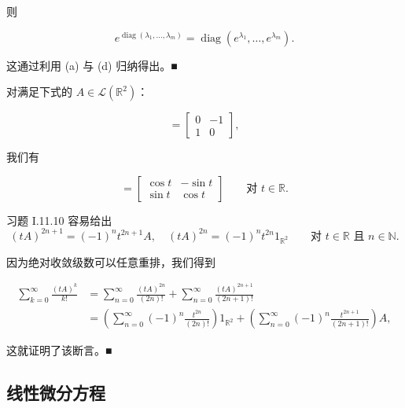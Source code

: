 \begin{example}
\begin{items}
则

\[
e^{\operatorname{diag}(\lambda_{1}, \ldots, \lambda_{m})} = \operatorname{diag}(e^{\lambda_{1}}, \ldots, e^{\lambda_{m}}) .
\]

\proofhead
这通过利用 (a) 与 (d) 归纳得出。\nobreak\hspace{0.35em}■
\item

对满足下式的 $ A \in \mathcal{L}(\mathbb{R}^{2}) $：

\begin{equation*}
[A] = \begin{bmatrix} 0 & -1 \\ 1 & 0 \end{bmatrix} ,
\end{equation*}

我们有

\begin{equation*}
[e^{tA}] = \begin{bmatrix} \cos t & -\sin t \\ \sin t & \cos t \end{bmatrix} \qquad \text{对 } t \in \mathbb{R} .
\end{equation*}

\proofhead
习题 I.11.10 容易给出
\[
(tA)^{2n+1} = (-1)^{n}t^{2n+1}A , \quad (tA)^{2n} = (-1)^{n}t^{2n}1_{\mathbb{R}^{2}} \qquad \text{对 } t \in \mathbb{R} \text{ 且 } n \in \mathbb{N} .
\]

因为绝对收敛级数可以任意重排，我们得到

\begin{equation*}
\begin{aligned}
\sum_{k=0}^{\infty} \frac{(tA)^{k}}{k!} &= \sum_{n=0}^{\infty} \frac{(tA)^{2n}}{(2n)!} + \sum_{n=0}^{\infty} \frac{(tA)^{2n+1}}{(2n+1)!} \\ &= \left( \sum_{n=0}^{\infty} (-1)^{n}\frac{t^{2n}}{(2n)!} \right)1_{\mathbb{R}^{2}} + \left( \sum_{n=0}^{\infty} (-1)^{n}\frac{t^{2n+1}}{(2n+1)!} \right)A ,
\end{aligned}
\end{equation*}

这就证明了该断言。\nobreak\hspace{0.35em}■

\end{items}

\end{example}

\subsection*{线性微分方程}

